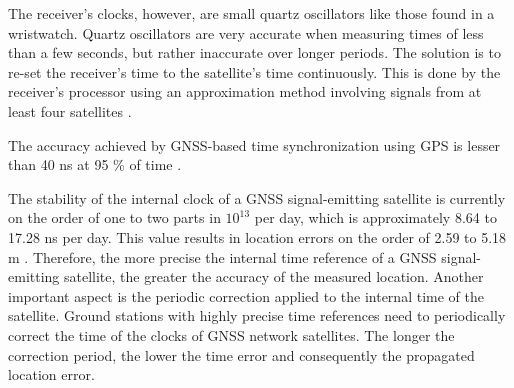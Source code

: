 The receiver's clocks, however, are small quartz oscillators like those found in a wristwatch. Quartz oscillators are very accurate when measuring times of less than a few seconds, but rather inaccurate over longer periods. The solution is to re-set the receiver’s time to the satellite's time continuously. This is done by the receiver's processor using an approximation method involving signals from at least four satellites \cite{gmv2011}.

The accuracy achieved by GNSS-based time synchronization using GPS is lesser than 40 ns at 95 \% of time \cite{gps-standard}.


The stability of the internal clock of a GNSS signal-emitting satellite is currently on the order of one to two parts in $10^{13}$ per day, which is approximately 8.64 to 17.28 ns per day. This value results in location errors on the order of 2.59 to 5.18 m \cite{ahmed2002}. Therefore, the more precise the internal time reference of a GNSS signal-emitting satellite, the greater the accuracy of the measured location. Another important aspect is the periodic correction applied to the internal time of the satellite. Ground stations with highly precise time references need to periodically correct the time of the clocks of GNSS network satellites. The longer the correction period, the lower the time error and consequently the propagated location error.


